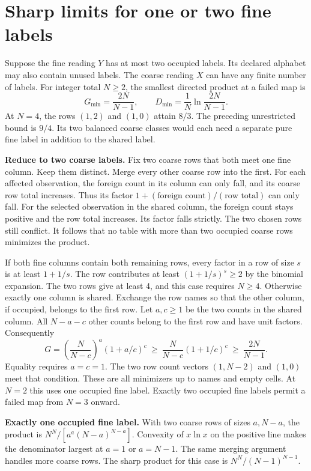 \clearpage

\section{Sharp limits for one or two fine labels}\label{sharp-limits-for-one-or-two-fine-labels}

Suppose the fine reading \(Y\) has at most two occupied labels. Its declared alphabet may also contain unused labels. The coarse reading \(X\) can have any finite number of labels. For integer total \(N\ge2\), the smallest directed product at a failed map is \[
G_{\min}=\frac{2N}{N-1},\qquad D_{\min}=\frac{1}{N}\ln\frac{2N}{N-1}.
\] At \(N=4\), the rows \((1,2)\) and \((1,0)\) attain \(8/3\). The preceding unrestricted bound is \(9/4\). Its two balanced coarse classes would each need a separate pure fine label in addition to the shared label.

\textbf{Reduce to two coarse labels.} Fix two coarse rows that both meet one fine column. Keep them distinct. Merge every other coarse row into the first. For each affected observation, the foreign count in its column can only fall, and its coarse row total increases. Thus its factor \(1+(\text{foreign count})/(\text{row total})\) can only fall. For the selected observation in the shared column, the foreign count stays positive and the row total increases. Its factor falls strictly. The two chosen rows still conflict. It follows that no table with more than two occupied coarse rows minimizes the product.

If both fine columns contain both remaining rows, every factor in a row of size \(s\) is at least \(1+1/s\). The row contributes at least \((1+1/s)^s\ge2\) by the binomial expansion. The two rows give at least 4, and this case requires \(N\ge4\). Otherwise exactly one column is shared. Exchange the row names so that the other column, if occupied, belongs to the first row. Let \(a,c\ge1\) be the two counts in the shared column. All \(N-a-c\) other counts belong to the first row and have unit factors. Consequently \[
G=\left(\frac{N}{N-c}\right)^a(1+a/c)^c
\ \ge\ \frac{N}{N-c}(1+1/c)^c
\ \ge\ \frac{2N}{N-1}.
\] Equality requires \(a=c=1\). The two row count vectors \((1,N-2)\) and \((1,0)\) meet that condition. These are all minimizers up to names and empty cells. At \(N=2\) this uses one occupied fine label. Exactly two occupied fine labels permit a failed map from \(N=3\) onward.

\textbf{Exactly one occupied fine label.} With two coarse rows of sizes \(a,N-a\), the product is \(N^N/[a^a(N-a)^{N-a}]\). Convexity of \(x\ln x\) on the positive line makes the denominator largest at \(a=1\) or \(a=N-1\). The same merging argument handles more coarse rows. The sharp product for this case is \(N^N/(N-1)^{N-1}\).

